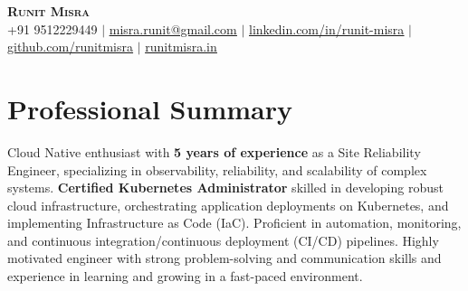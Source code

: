 \documentclass[letterpaper,11pt]{article}
\begin{document}

\begin{center}
    \textbf{\Huge \scshape Runit Misra} \\ \vspace{1pt}
    \small +91 9512229449 $|$ \href{mailto:misra.runit@gmail.com}{\underline{misra.runit@gmail.com}} $|$ 
    \href{https://linkedin.com/in/runit-misra}{\underline{linkedin.com/in/runit-misra}} $|$
    \href{https://github.com/runitmisra}{\underline{github.com/runitmisra}} $|$
    \href{https://www.runitmisra.in}{\underline{runitmisra.in}}
\end{center}

%
\section{Professional Summary}
 \begin{itemize}[leftmargin=0.15in, label={}]
    \small{\item{Cloud Native enthusiast with \textbf{5 years of experience} as a Site Reliability Engineer, specializing in observability, reliability, and scalability of complex systems. \textbf{Certified Kubernetes Administrator} skilled in developing robust cloud infrastructure, orchestrating application deployments on Kubernetes, and implementing Infrastructure as Code (IaC). Proficient in automation, monitoring, and continuous integration/continuous deployment (CI/CD) pipelines. Highly motivated engineer with strong problem-solving and communication skills and experience in learning and growing in a fast-paced environment.}}
 \end{itemize}

%
\end{document}
